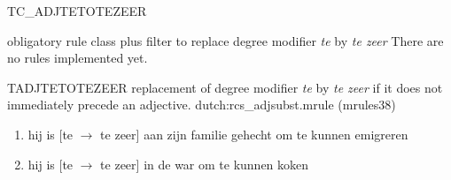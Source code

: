 \begin{mruleclass}{TC\_ADJTETOTEZEER}
\begin{classdescr}
\kind obligatory rule class plus filter
\classtask to replace degree modifier {\em te} by {\em te zeer} 
\classremarks 
There are no rules implemented yet.
\nofilters
\nospeedrules
{}
\end{classdescr}

\begin{members}
\begin{member}
 TADJTETOTEZEER
 replacement of degree modifier {\em te} by {\em te zeer}
if it does not
immediately precede an adjective.
\file dutch:rcs\_adjsubst.mrule (mrules38)
\semantics \nosemantics
\example \mbox{}
\begin{enumerate} 
\item
hij is [te $\rightarrow$ te zeer] aan zijn familie gehecht 
                            om te kunnen emigreren 
\item 
hij is [te $\rightarrow$ te zeer] in de war om te kunnen koken
\end{enumerate}
\remarks\mbox{}
\end{member}

\end{members}

\end{mruleclass}

